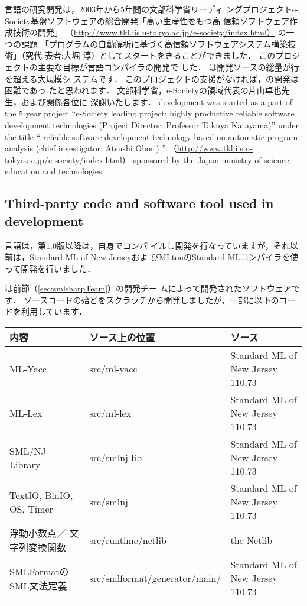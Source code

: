 \ifjp%
	\smlsharp{}言語の研究開発は，2003年から5年間の文部科学省リーディ
ングプロジェクトe-Society基盤ソフトウェアの総合開発「高い生産性をもつ高
信頼ソフトウェア作成技術の開発」
（\url{http://www.tkl.iis.u-tokyo.ac.jp/e-society/index.html）}
の一つの課題
「プログラムの自動解析に基づく高信頼ソフトウェアシステム構築技術」（究代
表者:大堀 淳）としてスタートをきることができました．
	このプロジェクトの主要な目標が\smlsharp{}言語コンパイラの開発で
した．
	\smlsharp{}は開発ソースの総量が\smlsharpSize{}行を超える大規模シ
ステムです．
	このプロジェクトの支援がなければ，\smlsharp{}の開発は困難であっ
たと思われます．
	文部科学省，e-Societyの領域代表の片山卓也先生，および関係各位に
深謝いたします．
\else%
	\smlsharp{} development was started as a part of the 5 year
project 
``e-Society leading project: highly productive reliable software
development technologies (Project Director: Professor Takuya Katayama)'' 
under the title
``
reliable software development technology based on automatic program analysis
(chief investigator: Atsushi Ohori)
''
（\url{http://www.tkl.iis.u-tokyo.ac.jp/e-society/index.html}）
sponsored by the Japan ministry of science, education and technologies.
\fi%

\subsection{
    {Third-party code and software tool used in \smlsharp{} development}
}

\ifjp%
	\smlsharp{}言語は，第1.0版以降は，\smlsharp{}自身でコンパ
イルし開発を行なっていますが，それ以前は，Standard ML of New Jerseyおよ
びMLtonのStandard MLコンパイラを使って開発を行いました．

	\smlsharp{}は前節（\ref{sec:smlsharpTeam}）の開発チー
ムによって開発されたソフトウェアです．
	ソースコードの殆どをスクラッチから開発しましたが，一部に以下のコー
ドを利用しています．

\begin{center}
\begin{tabular}{|l|l|l|}
\hline
内容 & \smlsharp{}ソース上の位置 & ソース
\\\hline
ML-Yacc & src/ml-yacc  & Standard ML of New Jersey 110.73
\\\hline
ML-Lex & src/ml-lex  & Standard ML of New Jersey 110.73
\\\hline
SML/NJ Library & src/smlnj-lib &  Standard ML of New Jersey 110.73
\\\hline
TextIO,
BinIO,
OS,
Timer
&
src/smlnj
&
Standard ML of New Jersey 110.73
\\\hline
浮動小数点／
文字列変換関数
&
src/runtime/netlib
&
the Netlib
\\\hline
SMLFormatの
SML文法定義
&
src/smlformat/generator/main/
&
Standard ML of New Jersey 110.73
\\\hline
\end{tabular}
\end{center}


